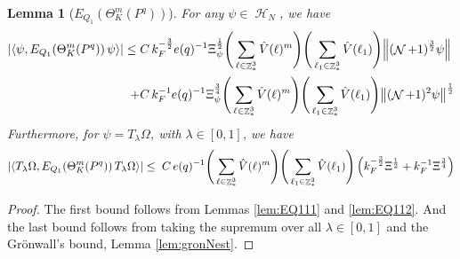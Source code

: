 \documentclass[sn-mathphys, Numbered ,a4paper]{sn-jnl}%
\DeclareMathOperator{\Z}{\mathbb{Z}}
\DeclareMathOperator{\HH}{\mathcal{H}}
\DeclareMathOperator{\NN}{\mathcal{N}}
\newcommand{\half}{\frac{1}{2}}
\newcommand{\eva}[1]{\left\langle #1 \right\rangle}
\theoremstyle{plain}
\newtheorem{lemma}[theorem]{Lemma}
\theoremstyle{definition}
\theoremstyle{remark}
\theoremstyle{plain}
\theoremstyle{definition}
\theoremstyle{remark}
\begin{document}
\begin{lemma}[$E_{Q_1}(\Theta^m_{K}(P^q))$]\label{lem:finEQ1est}
	For any $\psi \in \HH_N$, we have
	\begin{align}
		\abs{\eva{\psi, E_{Q_1}\!\left(\Theta^m_K(P^q)\right)  \psi}} \leq \; &C\,  k_{F}^{-\frac{3}{2}} e(q)^{-1} \Xi_{\psi}^\half \Bigg(\sum\limits_{\ell \in \Z^3_*} \hat{V}(\ell)^m\Bigg)\Bigg( \sum\limits_{\ell_1 \in \Z^3_*} \hat{V}(\ell_1) \Bigg) \norm { (\NN+1)^{\frac{3}{2}} \psi } \nonumber\\
		\;+ &C\, k_{F}^{-1} e(q)^{-1} \Xi_{\psi}^{\frac{3}{4}} \Bigg(\sum\limits_{\ell \in \Z^3_*} \hat{V}(\ell)^m\Bigg) \Bigg(\sum\limits_{\ell_1 \in \Z^3_*} \hat{V}(\ell_1) \Bigg)  \norm{ (\NN+1)^2\psi}^\half \label{eq:genEQ1est}
	\end{align}
Furthermore, for $\psi = T_{\lambda}\Omega$, with $\lambda \in [0,1]$, we have 
\begin{equation}
	\abs{\eva{ T_{\lambda}\Omega, E_{Q_1}\!\left(\Theta^m_K(P^q) \right)  T_{\lambda}\Omega}} \leq \; C\, e(q)^{-1}  \Bigg(\sum\limits_{\ell \in \Z^3_*} \hat{V}(\ell)^m\Bigg)\Bigg( \sum\limits_{\ell_1 \in \Z^3_*} \hat{V}(\ell_1) \Bigg)\left( k_{F}^{-\frac{3}{2}} \Xi^\half 
	+ k_{F}^{-1}\Xi^{\frac{3}{4}} \right) \label{eq:finalEQ1est}
\end{equation}
\end{lemma}
\begin{proof}
	The first bound follows from Lemmas \ref{lem:EQ111} and \ref{lem:EQ112}. And the last bound follows from taking the supremum over all $\lambda \in [0,1]$ and the Gr\"onwall's bound, Lemma \ref{lem:gronNest}. 
\end{proof}
\end{document}
